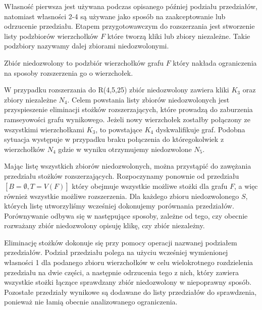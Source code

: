 Własność pierwsza jest używana podczas opisanego później podziału przedziałów, natomiast własności 2-4 są używane jako sposób na zaakceptowanie lub odrzucenie przedziału.
Etapem przygotowawczym do rozszerzania jest stworzenie listy podzbiorów wierzchołków $F$ które tworzą kliki lub zbiory niezależne. Takie podzbiory nazywamy dalej zbiorami niedozwolonymi. 

\begin{definition} Zbiór niedozwolony to podzbiór wierzchołków grafu $F$ który nakłada ograniczenia na sposoby rozszerzenia go o wierzchołek.
\end{definition}

W przypadku rozszerzania do R(4,5,25) zbiór niedozwolony zawiera kliki $K_3$ oraz zbiory niezależne $N_4$. Celem powstania listy zbiorów niedozwolonych jest przyspieszenie eliminacji stożków rozszerzających, które prowadzą do zaburzenia ramseyowości grafu wynikowego. Jeżeli nowy wierzchołek zostałby połączony ze wszystkimi wierzchołkami $K_3$, to powstające $K_4$ dyskwalifikuje graf. Podobna sytuacja występuje w przypadku braku połączenia do któregokolwiek z wierzchołków $N_4$ gdzie w wyniku otrzymujemy niedozwolone $N_5$. 

Mając listę wszystkich zbiorów niedozwolonych, można przystąpić do zawężania przedziału stożków rozszerzających. Rozpoczynamy ponownie od przedziału $[B = \emptyset, T = V(F) ]$ który obejmuje wszystkie możliwe stożki dla grafu $F$, a więc również wszystkie możliwe rozszerzenia. Dla każdego zbioru niedozwolonego $S$, których listę utworzyliśmy wcześniej dokonujemy porównania przedziałów. Porównywanie odbywa się w następujące sposoby, zależne od tego, czy obecnie rozważany zbiór niedozwolony opisuję klikę, czy zbiór niezależny.

Eliminację stożków dokonuje się przy pomocy operacji nazwanej podziałem przedziałów. Podział przedziału polega na użyciu wcześniej wymienionej własności 1 dla podanego zbioru wierzchołków w celu wielokrotnego rozdzielenia przedziału na dwie części, a następnie odrzucenia tego z nich, który zawiera wszystkie stożki łączące sprawdzany zbiór niedozwolony w niepoprawny sposób. Pozostałe przedziały wynikowe są dodawane do listy przedziałów do sprawdzenia, ponieważ nie łamią obecnie analizowanego ograniczenia. 

